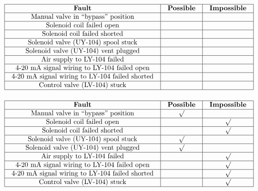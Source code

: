 $$\vbox{\offinterlineskip
\halign{\strut
\vrule \quad\hfil # \ \hfil & 
\vrule \quad\hfil # \ \hfil & 
\vrule \quad\hfil # \ \hfil \vrule \cr
\noalign{\hrule}
%
{\bf Fault} & {\bf Possible} & {\bf Impossible} \cr
%
\noalign{\hrule}
%
Manual valve in ``bypass'' position &  &  \cr
%
\noalign{\hrule}
%
Solenoid coil failed open &  &  \cr
%
\noalign{\hrule}
%
Solenoid coil failed shorted &  &  \cr
%
\noalign{\hrule}
%
Solenoid valve (UY-104) spool stuck &  &  \cr
%
\noalign{\hrule}
%
Solenoid valve (UY-104) vent plugged &  &  \cr
%
\noalign{\hrule}
%
Air supply to LY-104 failed &  &  \cr
%
\noalign{\hrule}
%
4-20 mA signal wiring to LY-104 failed open &  &  \cr
%
\noalign{\hrule}
%
4-20 mA signal wiring to LY-104 failed shorted &  &  \cr
%
\noalign{\hrule}
%
Control valve (LV-104) stuck &  &  \cr
%
\noalign{\hrule}
} %
}$$ %








$$\vbox{\offinterlineskip
\halign{\strut
\vrule \quad\hfil # \ \hfil & 
\vrule \quad\hfil # \ \hfil & 
\vrule \quad\hfil # \ \hfil \vrule \cr
\noalign{\hrule}
%
{\bf Fault} & {\bf Possible} & {\bf Impossible} \cr
%
\noalign{\hrule}
%
Manual valve in ``bypass'' position & $\surd$ &  \cr
%
\noalign{\hrule}
%
Solenoid coil failed open &  & $\surd$ \cr
%
\noalign{\hrule}
%
Solenoid coil failed shorted &  & $\surd$ \cr
%
\noalign{\hrule}
%
Solenoid valve (UY-104) spool stuck & $\surd$ &  \cr
%
\noalign{\hrule}
%
Solenoid valve (UY-104) vent plugged & $\surd$ &  \cr
%
\noalign{\hrule}
%
Air supply to LY-104 failed &  & $\surd$ \cr
%
\noalign{\hrule}
%
4-20 mA signal wiring to LY-104 failed open &  & $\surd$ \cr
%
\noalign{\hrule}
%
4-20 mA signal wiring to LY-104 failed shorted &  & $\surd$ \cr
%
\noalign{\hrule}
%
Control valve (LV-104) stuck &  & $\surd$ \cr
%
\noalign{\hrule}
} %
}$$ %






